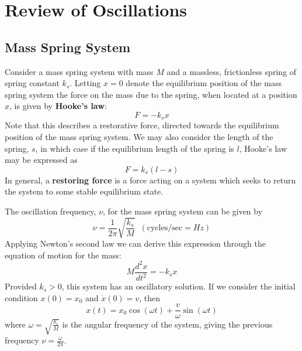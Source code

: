 \documentclass[12pt, a4paper, oneside, openright, titlepage]{book}
\begin{document}
\tableofcontents



\section{Review of Oscillations}

\subsection{Mass Spring System}

Consider a mass spring system with mass $M$ and a massless, frictionless spring of spring constant $k_s$. Letting $x = 0$ denote the equilibrium position of the mass spring system the force on the mass due to the spring, when located at a position $x$, is given by \textbf{Hooke's law}:
\begin{equation}
    F = -k_sx
\end{equation}
Note that this describes a restorative force, directed towards the equilibrium position of the mass spring system. We may also consider the length of the spring, $s$, in which case if the equilibrium length of the spring is $l$, Hooke's law may be expressed as 
\begin{equation}
    F = k_s(l-s)
\end{equation}
In general, a \textbf{restoring force} is a force acting on a system which seeks to return the system to some stable equilibrium state.


The oscillation frequency, $\nu$, for the mass spring system can be given by
\begin{equation}
    \nu = \frac{1}{2\pi}\sqrt{\frac{k_s}{M}}\;\;(\text{cycles/sec}  = Hz)
\end{equation}
Applying Newton's second law we can derive this expression through the equation of motion for the mass:
\begin{equation}
    M\frac{d^2x}{dt^2} = -k_sx
\end{equation}
Provided $k_s > 0$, this system has an oscillatory solution. If we consider the initial condition $x(0) = x_0$ and $\dot{x}(0) = v$, then
\begin{equation}
    x(t) = x_0\cos(\omega t)+\frac{v}{\omega}\sin(\omega t)
\end{equation}
where $\omega = \sqrt{\frac{k_s}{M}}$ is the angular frequency of the system, giving the previous frequency $\nu = \frac{\omega}{2\pi}$. 
\end{document}
